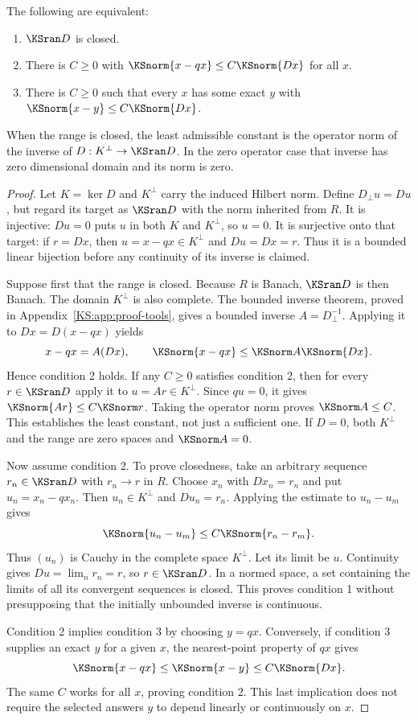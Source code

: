 \begin{KStheorem}\label{KS:KS43}
The following are equivalent:
\begin{enumerate}
\item \(\KSran D\) is closed.
\item There is \(C\ge0\) with \(\KSnorm{x-qx}\le C\KSnorm{Dx}\) for all \(x\).
\item There is \(C\ge0\) such that every \(x\) has some exact \(y\) with \(\KSnorm{x-y}\le C\KSnorm{Dx}\).
\end{enumerate}
When the range is closed, the least admissible constant is the operator norm of the inverse of \(D:K^\perp\to\KSran D\). In the zero operator case that inverse has zero dimensional domain and its norm is zero.
\end{KStheorem}
\begin{proof}
Let $K=\ker D$ and $K^\perp$ carry the induced Hilbert norm. Define $D_\perp u=Du$, but regard its target as $\KSran D$ with the norm inherited from $R$. It is injective: $Du=0$ puts $u$ in both $K$ and $K^\perp$, so $u=0$. It is surjective onto that target: if $r=Dx$, then $u=x-qx\in K^\perp$ and $Du=Dx=r$. Thus it is a bounded linear bijection before any continuity of its inverse is claimed.

Suppose first that the range is closed. Because $R$ is Banach, $\KSran D$ is then Banach. The domain $K^\perp$ is also complete. The bounded inverse theorem, proved in Appendix~\ref{KS:app:proof-tools}, gives a bounded inverse $A=D_\perp^{-1}$. Applying it to $Dx=D(x-qx)$ yields
\[
 x-qx=A(Dx),\qquad \KSnorm{x-qx}\le\KSnorm A\KSnorm{Dx}.
\]
Hence condition 2 holds. If any $C\ge0$ satisfies condition 2, then for every $r\in\KSran D$ apply it to $u=Ar\in K^\perp$. Since $qu=0$, it gives $\KSnorm{Ar}\le C\KSnorm r$. Taking the operator norm proves $\KSnorm A\le C$. This establishes the least constant, not just a sufficient one. If $D=0$, both $K^\perp$ and the range are zero spaces and $\KSnorm A=0$.

Now assume condition 2. To prove closedness, take an arbitrary sequence $r_n\in\KSran D$ with $r_n\to r$ in $R$. Choose $x_n$ with $Dx_n=r_n$ and put $u_n=x_n-qx_n$. Then $u_n\in K^\perp$ and $Du_n=r_n$. Applying the estimate to $u_n-u_m$ gives
\[
 \KSnorm{u_n-u_m}\le C\KSnorm{r_n-r_m}.
\]
Thus $(u_n)$ is Cauchy in the complete space $K^\perp$. Let its limit be $u$. Continuity gives $Du=\lim_n r_n=r$, so $r\in\KSran D$. In a normed space, a set containing the limits of all its convergent sequences is closed. This proves condition 1 without presupposing that the initially unbounded inverse is continuous.

Condition 2 implies condition 3 by choosing $y=qx$. Conversely, if condition 3 supplies an exact $y$ for a given $x$, the nearest-point property of $qx$ gives
\[
 \KSnorm{x-qx}\le\KSnorm{x-y}\le C\KSnorm{Dx}.
\]
The same $C$ works for all $x$, proving condition 2. This last implication does not require the selected answers $y$ to depend linearly or continuously on $x$.
\end{proof}
